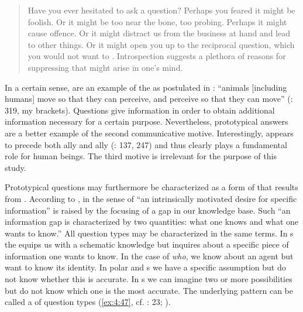 \begin{quote}
Have you ever hesitated to ask a question? Perhaps you feared it might be foolish. Or it might be too near the bone, too probing. Perhaps it might cause offence. Or it might distract us from the business at hand and lead to other things. Or it might open you up to the reciprocal question, which you would not want to . Introspection suggests a plethora of reasons for suppressing  that might arise in one’s mind. \citep[19]{Levinson2012b}
\end{quote}

\noindent In a certain sense,  are an example of the \textit{} as postulated in : “animals [including humans] move so that they can perceive, and perceive so that they can move” (\citealt{SwensonTurvey1991}: 319, my brackets). Questions give information in order to obtain additional information necessary for a certain purpose. Nevertheless, prototypical answers are a better example of the second communicative motive. Interestingly,  appears to precede  both ally and ally (\citealt{Tomasello2008}: 137, 247) and thus clearly plays a fundamental role for human beings. The third motive is irrelevant for the purpose of this study.

Prototypical questions may furthermore be characterized as a form of \textit{} that results from \textit{}. According to \citet[87]{Loewenstein1994},  in the sense of “an intrinsically motivated desire for specific information” is raised by the focusing of a gap in our knowledge base. Such “an information gap is characterized by two quantities: what one knows and what one wants to know.” All question types may be characterized in the same terms. In s the  equips us with a schematic knowledge but inquires about a specific piece of information one wants to know. In the case of \textit{who}, we know about an agent but want to know its identity. In polar and s we have a specific assumption but do not know whether this is accurate. In s we can imagine two or more possibilities but do not know which one is the most accurate. The underlying pattern can be called a \textit{} of question types (\ref{ex:4:47}, cf. \citealt{Levinson2012b}: 23; \citealt{Hölzl2016b}).

